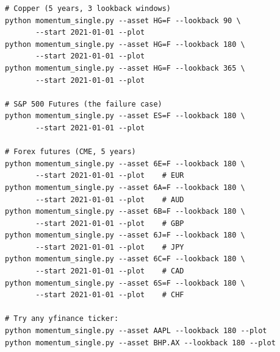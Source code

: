 \documentclass[11pt,a4paper]{article}
\begin{document}
\begin{codebox}
\begin{lstlisting}[style=shell]
# Copper (5 years, 3 lookback windows)
python momentum_single.py --asset HG=F --lookback 90 \
       --start 2021-01-01 --plot
python momentum_single.py --asset HG=F --lookback 180 \
       --start 2021-01-01 --plot
python momentum_single.py --asset HG=F --lookback 365 \
       --start 2021-01-01 --plot

# S&P 500 Futures (the failure case)
python momentum_single.py --asset ES=F --lookback 180 \
       --start 2021-01-01 --plot

# Forex futures (CME, 5 years)
python momentum_single.py --asset 6E=F --lookback 180 \
       --start 2021-01-01 --plot    # EUR
python momentum_single.py --asset 6A=F --lookback 180 \
       --start 2021-01-01 --plot    # AUD
python momentum_single.py --asset 6B=F --lookback 180 \
       --start 2021-01-01 --plot    # GBP
python momentum_single.py --asset 6J=F --lookback 180 \
       --start 2021-01-01 --plot    # JPY
python momentum_single.py --asset 6C=F --lookback 180 \
       --start 2021-01-01 --plot    # CAD
python momentum_single.py --asset 6S=F --lookback 180 \
       --start 2021-01-01 --plot    # CHF

# Try any yfinance ticker:
python momentum_single.py --asset AAPL --lookback 180 --plot
python momentum_single.py --asset BHP.AX --lookback 180 --plot
\end{lstlisting}
\end{codebox}
\end{document}
